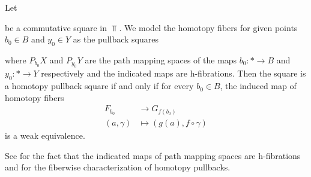 \begin{prop}\label{prop:fiberwiseCharOfHtpyPb}
    Let 
    \begin{center}
    \end{center}
    be a commutative square in $\Top$. 
    We model the homotopy fibers for given points $b_0\in B$ and $y_0\in Y$ as the pullback squares
    \begin{center} 
    \end{center}
    where $P_{b_0}X$ and $P_{y_0}Y$ are the path mapping spaces of the maps $b_0\colon *\to B$ and  $y_0\colon *\to Y$ respectively and the indicated maps are h-fibrations. 
    Then the square is a homotopy pullback square if and only if for every $b_0\in B$, the induced map of homotopy fibers
    \begin{align*}
        F_{b_0}&\to G_{f(b_0)} \\
        (a,\gamma)&\mapsto(g(a),f\circ\gamma)
    \end{align*}
    is a weak equivalence.
    \begin{reference}
        See \cite[Proposition 2.2.2]{cubical_htpy_theory} for the fact that the indicated maps of path mapping spaces are h-fibrations and \cite[Proposition 3.3.18]{cubical_htpy_theory} for the fiberwise characterization of homotopy pullbacks.
    \end{reference}
\end{prop}
